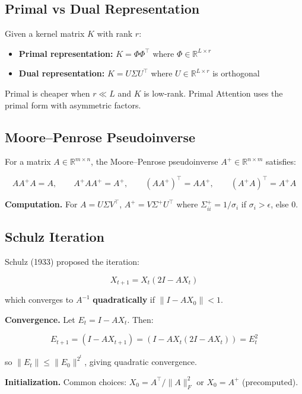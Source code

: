 \subsection{Primal vs Dual Representation}

Given a kernel matrix $K$ with rank $r$:

\begin{itemize}
\item \textbf{Primal representation:} $K = \Phi \Phi^\top$ where $\Phi \in \mathbb{R}^{L \times r}$
\item \textbf{Dual representation:} $K = U \Sigma U^\top$ where $U \in \mathbb{R}^{L \times r}$ is orthogonal

\end{itemize}
Primal is cheaper when $r \ll L$ and $K$ is low-rank. Primal Attention uses 
the primal form with asymmetric factors.

\subsection{Moore--Penrose Pseudoinverse}

For a matrix $A \in \mathbb{R}^{m \times n}$, the Moore--Penrose pseudoinverse 
$A^+ \in \mathbb{R}^{n \times m}$ satisfies:

\[
A A^+ A = A, \qquad A^+ A A^+ = A^+, \qquad (A A^+)^\top = A A^+, \qquad (A^+ A)^\top = A^+ A
\]

\textbf{Computation.} For $A = U \Sigma V^\top$, $A^+ = V \Sigma^+ U^\top$ where 
$\Sigma^+_{ii} = 1/\sigma_i$ if $\sigma_i > \epsilon$, else $0$.

\subsection{Schulz Iteration}

Schulz (1933) proposed the iteration:

\[
X_{t+1} = X_t (2I - A X_t)
\]

which converges to $A^{-1}$ \textbf{quadratically} if $\|I - A X_0\| < 1$.

\textbf{Convergence.} Let $E_t = I - A X_t$. Then:

\[
E_{t+1} = (I - A X_{t+1}) = (I - A X_t (2I - A X_t)) = E_t^2
\]

so $\|E_t\| \le \|E_0\|^{2^t}$, giving quadratic convergence.

\textbf{Initialization.} Common choices: $X_0 = A^\top / \|A\|_F^2$ or $X_0 = A^+$ 
(precomputed).

